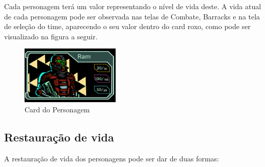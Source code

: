 \documentclass[11pt]{article} %
\begin{document}
Cada personagem terá um valor representando o nível de vida deste. A vida atual de cada personagem pode ser observada nas telas de Combate, Barracks e na tela de seleção do time, aparecendo o seu valor dentro do card roxo, como pode ser visualizado na figura a seguir.

\begin{figure}[!htp]
\centering
\includegraphics[scale=0.75]{res/card.png}
\caption{Card do Personagem}
\label{Card do Personagem}
\end{figure}

\subsection{Restauração de vida}

A restauração de vida dos personagens pode ser dar de duas formas:
\end{document}
